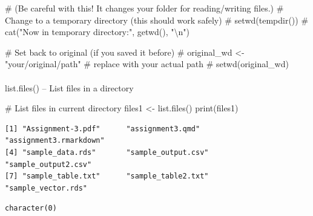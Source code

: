 \documentclass[
  letterpaper,
  DIV=11,
  numbers=noendperiod]{scrartcl}
\makeatletter
\let\oldparagraph\paragraph
\renewcommand{\paragraph}{
    \@ifstar
      \xxxParagraphStar
      \xxxParagraphNoStar
  }
\newcommand{\xxxParagraphStar}[1]{\oldparagraph*{#1}\mbox{}}
\newcommand{\xxxParagraphNoStar}[1]{\oldparagraph{#1}\mbox{}}
\newenvironment{Shaded}{\begin{snugshade}}{\end{snugshade}}
\newcommand{\AttributeTok}[1]{\textcolor[rgb]{0.40,0.45,0.13}{#1}}
\newcommand{\CommentTok}[1]{\textcolor[rgb]{0.37,0.37,0.37}{#1}}
\newcommand{\FunctionTok}[1]{\textcolor[rgb]{0.28,0.35,0.67}{#1}}
\newcommand{\NormalTok}[1]{\textcolor[rgb]{0.00,0.23,0.31}{#1}}
\newcommand{\OtherTok}[1]{\textcolor[rgb]{0.00,0.23,0.31}{#1}}
\newcommand{\SpecialCharTok}[1]{\textcolor[rgb]{0.37,0.37,0.37}{#1}}
\newcommand{\StringTok}[1]{\textcolor[rgb]{0.13,0.47,0.30}{#1}}
\makeatother
\begin{document}
\begin{Shaded}
\begin{Highlighting}[]
\CommentTok{\# (Be careful with this! It changes your folder for reading/writing files.)}
\CommentTok{\#   Change to a temporary directory (this should work safely)}
\CommentTok{\# setwd(tempdir())}
\CommentTok{\# cat("Now in temporary directory:", getwd(), "\textbackslash{}n")}

\CommentTok{\#   Set back to original (if you saved it before)}
\CommentTok{\# original\_wd \textless{}{-} "your/original/path"  \# replace with your actual path}
\CommentTok{\# setwd(original\_wd)}
\end{Highlighting}
\end{Shaded}

\paragraph{list.files() -- List files in a
directory}\label{list.files-list-files-in-a-directory}

\begin{Shaded}
\begin{Highlighting}[]
\CommentTok{\#   List files in current directory}
\NormalTok{files1 }\OtherTok{\textless{}{-}} \FunctionTok{list.files}\NormalTok{()}
\FunctionTok{print}\NormalTok{(files1)}
\end{Highlighting}
\end{Shaded}

\begin{verbatim}
[1] "Assignment-3.pdf"      "assignment3.qmd"       "assignment3.rmarkdown"
[4] "sample_data.rds"       "sample_output.csv"     "sample_output2.csv"   
[7] "sample_table.txt"      "sample_table2.txt"     "sample_vector.rds"    
\end{verbatim}

\begin{Shaded}
\end{Shaded}

\begin{verbatim}
character(0)
\end{verbatim}
\end{document}
